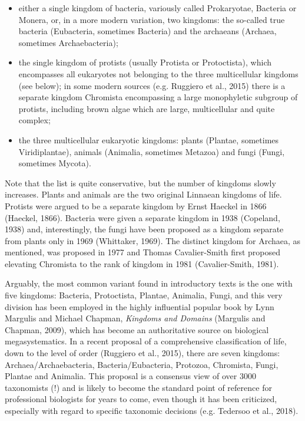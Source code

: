 \begin{artengenv}
\begin{itemize}
\item either a single kingdom of bacteria, variously called Prokaryotae, Bacteria or Monera, or, in a more modern
variation, two kingdoms: the so-called true bacteria (Eubacteria, sometimes Bacteria) and the archaeans (Archaea,
sometimes Archaebacteria);
\item the single kingdom of protists (usually Protista or Protoctista), which encompasses all eukaryotes not belonging
to the three multicellular kingdoms (see below); in some modern sources \label{ref:RNDdqkS30YvK5}(e.g. Ruggiero et al.,
2015) there is a separate kingdom Chromista encompassing a large monophyletic subgroup of protists, including brown
algae which are large, multicellular and quite complex;
\item the three multicellular eukaryotic kingdoms: plants (Plantae, sometimes Viridiplantae), animals (Animalia,
sometimes Metazoa) and fungi (Fungi, sometimes Mycota). 
\end{itemize}
Note that the list is quite conservative, but the number of kingdoms slowly increases. Plants and  animals are the two
original Linnaean kingdoms of life. Protists were argued to be a separate kingdom by Ernst Haeckel in 1866
\label{ref:RNDnC4UhA8FAD}(Haeckel, 1866). Bacteria were given a separate kingdom in 1938
\label{ref:RNDsDaQPHVHjj}(Copeland, 1938) and, interestingly, the fungi have been proposed as a kingdom separate from
plants only in 1969 \label{ref:RNDzC4ki5UDBu}(Whittaker, 1969). The distinct kingdom for Archaea, as mentioned, was
proposed in 1977 and Thomas Cavalier-Smith first proposed elevating Chromista to the rank of kingdom in 1981
\label{ref:RNDnKGExfa2wY}(Cavalier-Smith, 1981). 

Arguably, the most common variant found in introductory texts is the one with five kingdoms: Bacteria, Protoctista,
Plantae, Animalia, Fungi, and this very division has been employed in the highly influential popular book by Lynn
Margulis and Michael Chapman, \textit{Kingdoms and Domains }\label{ref:RND5xqZMYPEO1}(Margulis and Chapman, 2009),
which has become an authoritative source on biological megasystematics. In a recent proposal of a comprehensive
classification of life, down to the level of order \label{ref:RNDva9PR88ZHQ}(Ruggiero et al., 2015), there are seven
kingdoms: Archaea/Archaebacteria, Bacteria/Eubacteria, Protozoa, Chromista, Fungi, Plantae and Animalia. This proposal
is a consensus view of over 3000 taxonomists (!) and is likely to become the standard point of reference for
professional biologists for years to come, even though it has been criticized, especially with regard to specific
taxonomic decisions \label{ref:RND4kurLEBPnA}(e.g. Tedersoo et al., 2018).


\end{artengenv}
